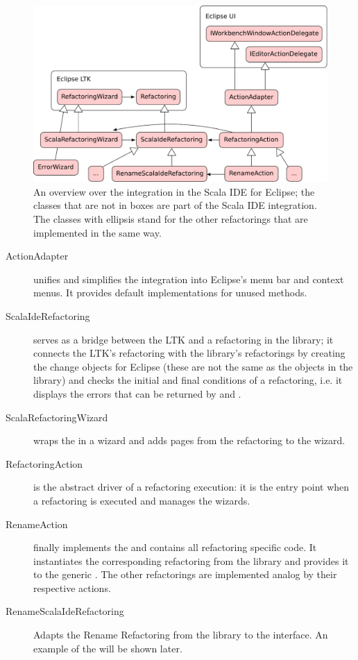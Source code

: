 \documentclass[10pt,a4paper,oneside]{scrreprt}
\begin{document}
\begin{figure}
  \centering
  \includegraphics[width=\linewidth]{eclipse-integration.pdf}
  \caption{An overview over the integration in the Scala IDE for Eclipse; the classes that are not in boxes are part of the Scala IDE integration. The classes with ellipsis stand for the other refactorings that are implemented in the same way.}
  \label{figure:eclipse-integration}
\end{figure}

\begin{description}
  \item[ActionAdapter] unifies and simplifies the integration into Eclipse's menu bar and context menus. It provides default implementations for unused methods.
  
  \item[ScalaIdeRefactoring] serves as a bridge between the LTK and a refactoring in the library; it connects the LTK's refactoring with the library's refactorings by creating the change objects for Eclipse (these are not the same as the  objects in the library) and checks the initial and final conditions of a refactoring, i.e. it displays the errors that can be returned by  and .
  
  \item[ScalaRefactoringWizard] wraps the  in a wizard and adds pages from the refactoring to the wizard.
  
  \item[RefactoringAction] is the abstract driver of a refactoring execution: it is the entry point when a refactoring is executed and manages the wizards.
  
  \item[RenameAction] finally implements the  and contains all refactoring specific code. It instantiates the corresponding refactoring from the library and provides it to the generic . The other refactorings are implemented analog by their respective actions.
  
  \item[RenameScalaIdeRefactoring] Adapts the Rename Refactoring from the library to the  interface. An example of the  will be shown later.
\end{description}
\end{document}
